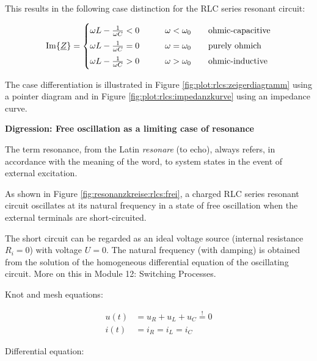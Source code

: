\begin{frame}
{    This results in the following case distinction for the RLC series resonant circuit:

    \begin{equation}
        \Im\{\underline{Z}\} =
    \begin{cases}
        \omega L - \frac{1}{\omega C} < 0 & \qquad \omega < \omega_0 \qquad\text{ohmic-capacitive}\vphantom{\Big|}\\
        \omega L - \frac{1}{\omega C} = 0 & \qquad \omega = \omega_0 \qquad\text{purely ohmich}\vphantom{\Big|}\\
        \omega L - \frac{1}{\omega C} > 0 & \qquad \omega > \omega_0 \qquad\text{ohmic-inductive}\vphantom{\Big|}
    \end{cases}
    \label{eq:rlcs:fallunterscheidung}
    \end{equation}

    The case differentiation is illustrated in Figure \ref{fig:plot:rlcs:zeigerdiagramm} using a pointer diagram 
    and in Figure \ref{fig:plot:rlcs:impedanzkurve} using an impedance curve.

    \textbf{Digression: Free oscillation as a limiting case of resonance} %
    
    The term resonance, from the Latin \textit{resonare} (to echo), 
    always refers, in accordance with the meaning of the word, to system states in the event of external excitation.

    As shown in Figure \ref{fig:resonanzkreise:rlcs:frei}, 
    a charged RLC series resonant circuit oscillates at its natural frequency in a state of free oscillation when the external terminals are short-circuited.
    
    The short circuit can be regarded as an ideal voltage source (internal resistance $R_i=0$) with voltage $U=0$.
    The natural frequency (with damping) is obtained from the solution of the homogeneous differential equation of the oscillating circuit.
    More on this in Module 12: Switching Processes.%
        
    Knot and mesh equations:

    \begin{align*}
        u(t) &= u_R + u_L + u_C \overset{!}{=} 0 \\
        i(t) &= i_R = i_L = i_C
    \end{align*}
  
    Differential equation:

}
\end{frame}
